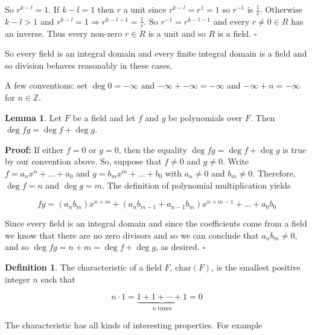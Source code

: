 \documentclass[11pt, oneside]{article}   	%
\theoremstyle{definition}
\newtheorem{definition}{Definition}[section]
\newtheorem{lemma}{Lemma}[section]
\begin{document}
\bigskip
\noindent
So $ r^{k-l} = 1 $. If $k-l = 1$ then $r$ a unit since $r^{k-l} = r^{1} = 1$ so $r^{-1}$ is $\frac{1}{r}$. Otherwise
$k-l > 1$ and $r^{k-l} = 1 \Rightarrow r^{k-l-1} = \frac{1}{r}$.   So $r^{-1} = r^{k-l -1}$ and 
every $r \neq 0 \in R$ has an inverse. Thus every non-zero  $r \in R$ is a unit and so $R$ is a field. $\square$

\bigskip
\noindent
So every field is an integral domain and every finite integral domain is a field and so division behaves reasonably in these cases. 


\bigskip
\noindent
A few conventions: set $\deg 0 = -\infty$ and $-\infty + -\infty = - \infty$ and $-\infty +n = -\infty$ for $n \in \mathbb{Z}$.

\begin{lemma}
Let $F$ be a field and let $f$ and $g$ be polynomials over $F$. Then $\deg fg = \deg f  + \deg g$.
\label{lemma:degree}
\end{lemma}

\noindent
\textbf{Proof:} If either $f = 0$ or $g = 0$, then the equality $\deg fg = \deg f + \deg g$ is true by our convention above. So, suppose that 
$f \neq 0$ and $g \neq 0$. Write $f = a_n x^n + \hdots + a_0$ and $g = b_m x^m + \hdots + b_0$ with $a_n \neq 0$ and $b_m \neq 0$.  
Therefore, $\deg f = n$ and $\deg g = m$. The definition of polynomial multiplication yields

\begin{equation*}
fg=(a_nb_m)x^{n+m} +(a_nb_{m-1} + a_{n-1} b_m)  x^{n+m-1} + \hdots +a_0b_0
\end{equation*}

\bigskip
\noindent
Since every field is an integral domain and since the coefficients come from a field we know that there are no zero divisors and so we can conclude
that $a_nb_m \neq 0$, and so $\deg fg = n + m = \deg f+ \deg g$, as desired. $\square$



\begin{definition}
The characteristic of a field $F$, $\text{char}(F)$, is the smallest positive integer $n$ such that

\begin{equation*}
n \cdot 1 = \underbrace{1 + 1 + \cdots + 1}_{n \text{ times}} = 0
\end{equation*}
\end{definition}



\bigskip
\noindent
The characteristic has all kinds of interesting properties. For example
\end{document}

